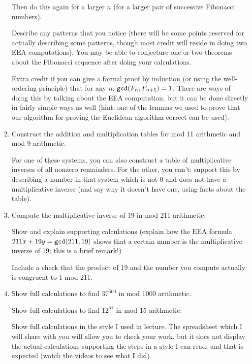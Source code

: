 \documentclass[12pt]{article}
\begin{document}
\begin{enumerate}
Then do this again for a larger $n$ (for a larger pair of successive Fibonacci numbers).

Describe any patterns that you notice (there will be some points reserved for actually describing some patterns, though most credit will reside in doing two EEA computations).  You may be able to conjecture one or two theorems about the Fibonacci sequence after doing your calculations.

Extra credit if you can give a formal proof by induction (or using the well-ordering principle) that for any $n$,  ${\tt gcd}(F_n,F_{n+1})=1$.  There are ways of doing this by talking about the EEA computation, but it can be done directly in fairly simple ways as well (hint:  one of the lemmas we used to prove that our algorithm for proving the Euclidean algorithm correct can be used).

\newpage

\item  Construct the addition and multiplication tables for mod 11 arithmetic and mod 9 arithmetic.

For one of these systems, you can also construct a table of multiplicative inverses  of all nonzero remainders.  For the other, you can't:  support this by describing a number in that system which is not 0 and does not have a multiplicative inverse
(and say why it doesn't have one, using facts about the table).

\newpage

\item  Compute the multiplicative inverse of 19 in mod 211 arithmetic.

Show and explain supporting calculations (explain how the EEA formula $211x+19y = {\tt gcd}(211,19)$ shows that a certain number is the multiplicative inverse of 19; this is a brief remark!)

Include a check that the product of 19 and the number you compute actually is congruent to 1 mod 211.

\newpage

\item  Show full calculations to find $37^{500}$ in mod 1000 arithmetic.

Show full calculations to find $12^{51}$ in mod 15 arithmetic.

Show full calculations in the style I used in lecture.  The spreadsheet which I will share with you will allow you to check your work, but it does not display the
actual calculations supporting the steps in a style I can read, and that is expected (watch the videos to see what I did).


\end{enumerate}
\end{document}
